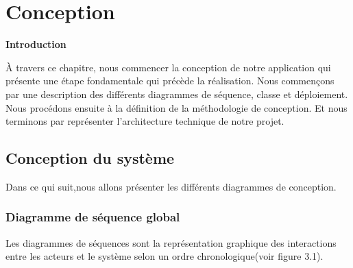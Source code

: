 \chapter{\Large Conception}

\textbf{\huge Introduction}
 
À travers ce chapitre, nous commencer  la conception de notre application qui présente une étape fondamentale qui précède la réalisation. Nous commençons par une description des différents diagrammes de séquence, classe et déploiement. Nous procédons ensuite à la définition de la méthodologie de conception. Et nous terminons par représenter l'architecture technique de notre projet.
\section{\selectfont\Large  Conception du système}

Dans ce qui suit,nous allons présenter les différents diagrammes de conception. \\[0.1cm]
            \subsection{\selectfont\Large Diagramme de séquence global}
         Les diagrammes de séquences sont la représentation graphique des interactions entre les acteurs et le système selon un ordre chronologique\cite{14}(voir figure 3.1).
            
              
            
